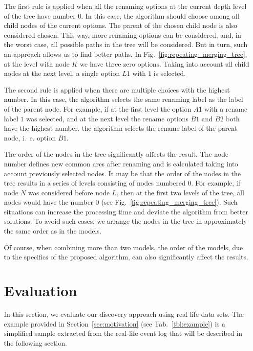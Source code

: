 \documentclass[11pt]{article}
\theoremstyle{definition}
\begin{document}
The first rule is applied when all the renaming options at the current depth level of the tree have number 0. In this case, the algorithm should choose among all child nodes of the current options. The parent of the chosen child node is also considered chosen. This way, more renaming options can be considered, and, in the worst case, all possible paths in the tree will be considered. But in turn, such an approach allows us to find better paths. In Fig.~\ref{fig:repeating_merging_tree}, at the level with node $K$ we have three zero options. Taking into account all child nodes at the next level, a single option $L1$ with $1$ is selected.

The second rule is applied when there are multiple choices with the highest number. In this case, the algorithm selects the same renaming label as the label of the parent node. For example, if at the first level the option $A1$ with a rename label $1$ was selected, and at the next level the rename options $B1$ and $B2$ both have the highest number, the algorithm selects the rename label of the parent node, i.\ e. option $B1$.

The order of the nodes in the tree significantly affects the result. The node number defines new common arcs after renaming and is calculated taking into account previously selected nodes. It may be that the order of the nodes in the tree results in a series of levels consisting of nodes numbered $0$. For example, if node $N$ was considered before node $L$, then at the first two levels of the tree, all nodes would have the number 0 (see Fig.~\ref{fig:repeating_merging_tree}). Such situations can increase the processing time and deviate the algorithm from better solutions. To avoid such cases, we arrange the nodes in the tree in approximately the same order as in the models.

Of course, when combining more than two models, the order of the models, due to the specifics of the proposed algorithm, can also significantly affect the results.

\section{Evaluation}\label{sec:evaluation}

In this section, we evaluate our discovery approach using real-life data sets. 
The example provided in Section~\ref{sec:motivation} (see Tab.~\ref{tbl:example}) is a simplified sample extracted from the real-life event log that will be described in the following section.
\end{document}
